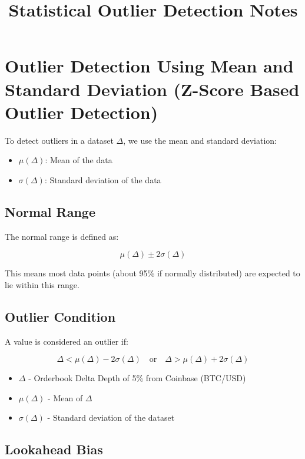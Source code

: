 \documentclass[12pt]{article}
\title{\Huge Statistical Outlier Detection Notes}
\author{}
\date{}
\begin{document}
\maketitle

\section*{Outlier Detection Using Mean and Standard Deviation (Z-Score Based Outlier Detection)}

To detect outliers in a dataset $\Delta$, we use the mean and standard deviation:

\begin{itemize}
    \item $\mu(\Delta)$: Mean of the data
    \item $\sigma(\Delta)$: Standard deviation of the data
\end{itemize}

\subsection*{Normal Range}

The normal range is defined as:

\[
\mu(\Delta) \pm 2\sigma(\Delta)
\]

This means most data points (about 95\% if normally distributed) are expected to lie within this range.

\subsection*{Outlier Condition}

A value is considered an outlier if:

\[
\Delta < \mu(\Delta) - 2\sigma(\Delta) \quad \text{or} \quad \Delta > \mu(\Delta) + 2\sigma(\Delta)
\]



\begin{itemize}
    \item $\Delta$ - Orderbook Delta Depth of 5\% from Coinbase (BTC/USD) 
    \item $\mu(\Delta)$ - Mean of $\Delta$
    \item $\sigma(\Delta)$ - Standard deviation of the dataset
\end{itemize}


\subsection*{Lookahead Bias}
\end{document}
